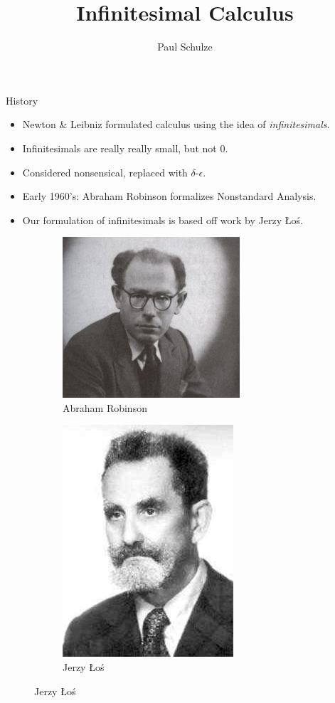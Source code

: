 \documentclass{beamer}
\title{Infinitesimal Calculus}
\author{Paul Schulze}
\date{}
\theoremstyle{plain}
\theoremstyle{definition}
\begin{document}
	
\begin{frame}
	\titlepage
\end{frame}
	

\begin{frame}{History}
\begin{itemize}
	\item Newton \& Leibniz formulated calculus using the idea of \textit{infinitesimals}.
	\item Infinitesimals are really really small, but not $0$.
	\item Considered nonsensical, replaced with $\delta$-$\epsilon$.
	\item Early 1960's: Abraham Robinson formalizes Nonstandard Analysis.
	\item Our formulation of infinitesimals is based off work by Jerzy \L o\'s.
\end{itemize}
\begin{figure}[h]
	\begin{subfigure}{0.4\textwidth}
		\centering
		\includegraphics[width=0.6\linewidth]{Robinson}
		\caption{Abraham Robinson}
	\end{subfigure}
	\begin{subfigure}{0.4\textwidth}
		\centering
		\includegraphics[width=0.4\linewidth]{Los}
		\caption{Jerzy \L o\'s}
	\end{subfigure}
\end{figure}
\end{frame}
\end{document}
